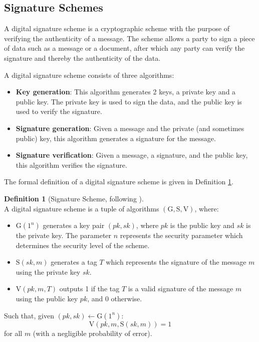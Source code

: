 \documentclass[11pt,a4paper]{report}
\theoremstyle{definition}
\newtheorem{definition}{Definition}[section]
\begin{document}
\subsection{Signature Schemes}
\label{sec:signatureschemes}
A digital signature scheme is a cryptographic scheme with the purpose of verifying the authenticity of a message. The scheme allows a party to sign a piece of data such as a message or a document, after which any party can verify the signature and thereby the authenticity of the data.

A digital signature scheme consists of three algorithms:
\begin{itemize}
  \item \textbf{Key generation}: This algorithm generates 2 keys, a private key and a public key. The private key is used to sign the data, and the public key is used to verify the signature.
  \item \textbf{Signature generation}: Given a message and the private (and sometimes public) key, this algorithm generates a signature for the message.
  \item \textbf{Signature verification}: Given a message, a signature, and the public key, this algorithm verifies the signature.
\end{itemize}
The formal definition of a digital signature scheme is given in Definition \ref{def:signaturescheme}.

\begin{definition}[Signature Scheme, following \cite{goldwasser2008lecture}]~\\
  \label{def:signaturescheme}
  A digital signature scheme is a tuple of algorithms $(\text{G}, \text{S}, \text{V})$, where:
  \begin{itemize}
    \item $\text{G}(1^n)$ generates a key pair $(pk, sk)$, where $pk$ is the public key and $sk$ is the private key. The parameter $n$ represents the security parameter which determines the security level of the scheme.
    \item $\text{S}(sk, m)$ generates a tag $T$ which represents the signature of the message $m$ using the private key $sk$.
    \item $\text{V}(pk, m, T)$ outputs 1 if the tag $T$ is a valid signature of the message $m$ using the public key $pk$, and 0 otherwise.
  \end{itemize}
  Such that, given $(pk, sk) \leftarrow \text{G}(1^n)$:
  \[
    \text{V}(pk, m, \text{S}(sk, m)) = 1
  \]
  for all $m$ (with a negligible probability of error).
\end{definition}
\end{document}
